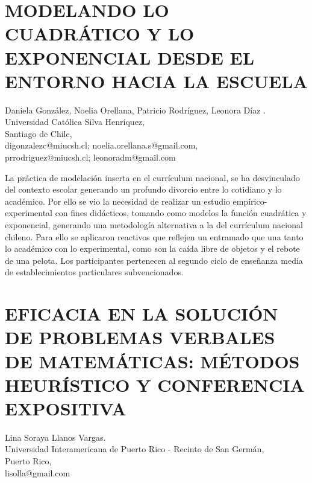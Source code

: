 \section{MODELANDO LO CUADRÁTICO Y LO EXPONENCIAL DESDE EL ENTORNO HACIA LA
ESCUELA}

\begin{datos}
Daniela González, Noelia Orellana, Patricio Rodríguez, Leonora Díaz .\\
Universidad Católica Silva Henríquez,\\
Santiago de Chile,\\
\hfill  digonzalezc@miucsh.cl; noelia.orellana.s@gmail.com, \\
\hfill  prrodriguez@miucsh.cl; leonoradm@gmail.com
\end{datos}

La práctica de modelación inserta en el currículum nacional, se ha
desvinculado del contexto escolar generando un profundo divorcio entre
lo cotidiano y lo académico. Por ello se vio la necesidad de realizar
un estudio empírico-experimental con fines didácticos, tomando como
modelos la función cuadrática y exponencial, generando una metodología
alternativa a la del currículum nacional chileno. Para ello se aplicaron
reactivos que reflejen un entramado que una tanto lo académico con
lo experimental, como son la caída libre de objetos y el rebote de
una pelota. Los participantes pertenecen al segundo ciclo de enseñanza
media de establecimientos particulares subvencionados.


\section{EFICACIA EN LA SOLUCIÓN DE PROBLEMAS VERBALES DE MATEMÁTICAS: MÉTODOS
HEURÍSTICO Y CONFERENCIA EXPOSITIVA}

\begin{datos}
Lina Soraya Llanos Vargas.\\
Universidad Interamericana de Puerto Rico - Recinto de San Germán,\\
Puerto Rico,\\
\hfill  lisolla@gmail.com 
\end{datos}

